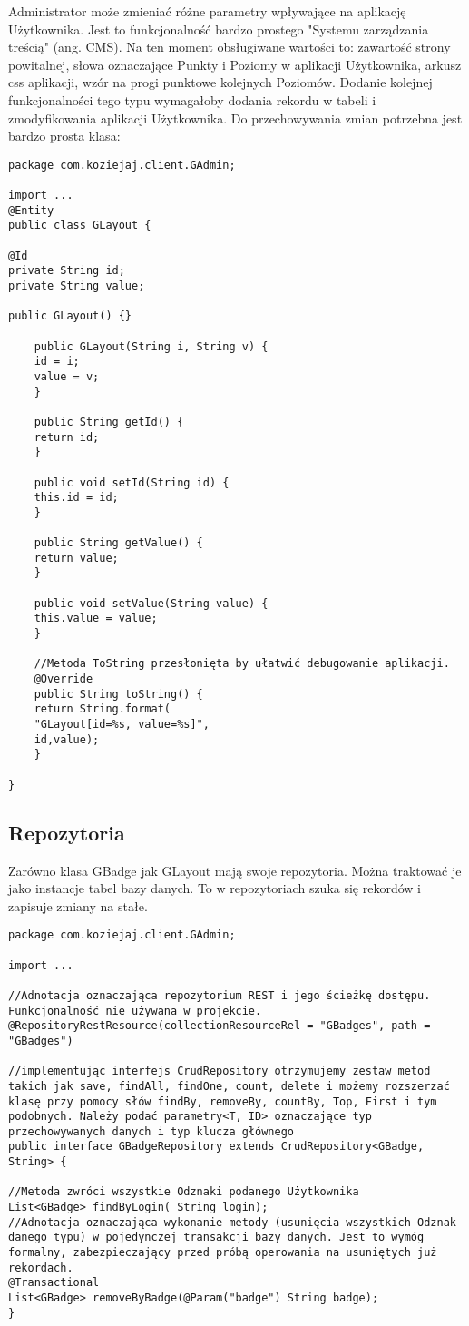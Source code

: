 \documentclass[a4paper,12pt,twoside,openany]{report}
\begin{document}
Administrator może zmieniać różne parametry wpływające na aplikację Użytkownika. Jest to funkcjonalność bardzo prostego "Systemu zarządzania treścią" (ang. CMS). Na ten moment obsługiwane wartości to: zawartość strony powitalnej, słowa oznaczające Punkty i Poziomy w aplikacji Użytkownika, arkusz css aplikacji, wzór na progi punktowe kolejnych Poziomów. Dodanie kolejnej funkcjonalności tego typu wymagałoby dodania rekordu w tabeli i zmodyfikowania aplikacji Użytkownika. Do przechowywania zmian potrzebna jest bardzo prosta klasa: 
\begin{lstlisting}
package com.koziejaj.client.GAdmin;

import ...
@Entity
public class GLayout {

@Id
private String id;
private String value;

public GLayout() {}

	public GLayout(String i, String v) {
	id = i;
	value = v;
	}

	public String getId() {
	return id;
	}

	public void setId(String id) {
	this.id = id;
	}

	public String getValue() {
	return value;
	}

	public void setValue(String value) {
	this.value = value;
	}
	
	//Metoda ToString przesłonięta by ułatwić debugowanie aplikacji.
	@Override
	public String toString() {
	return String.format(
	"GLayout[id=%s, value=%s]",
	id,value);
	}

}

\end{lstlisting}
\subsection{Repozytoria}
Zarówno klasa GBadge jak GLayout mają swoje repozytoria. Można traktować je jako instancje tabel bazy danych. To w repozytoriach szuka się rekordów i zapisuje zmiany na stałe. \cite{Spring}
\begin{lstlisting}
package com.koziejaj.client.GAdmin;

import ...

//Adnotacja oznaczająca repozytorium REST i jego ścieżkę dostępu. Funkcjonalność nie używana w projekcie.
@RepositoryRestResource(collectionResourceRel = "GBadges", path = "GBadges")

//implementując interfejs CrudRepository otrzymujemy zestaw metod takich jak save, findAll, findOne, count, delete i możemy rozszerzać klasę przy pomocy słów findBy, removeBy, countBy, Top, First i tym podobnych. Należy podać parametry<T, ID> oznaczające typ przechowywanych danych i typ klucza głównego
public interface GBadgeRepository extends CrudRepository<GBadge, String> {

//Metoda zwróci wszystkie Odznaki podanego Użytkownika
List<GBadge> findByLogin( String login);
//Adnotacja oznaczająca wykonanie metody (usunięcia wszystkich Odznak danego typu) w pojedynczej transakcji bazy danych. Jest to wymóg formalny, zabezpieczający przed próbą operowania na usuniętych już rekordach.
@Transactional
List<GBadge> removeByBadge(@Param("badge") String badge);
}
\end{lstlisting}
\end{document}

